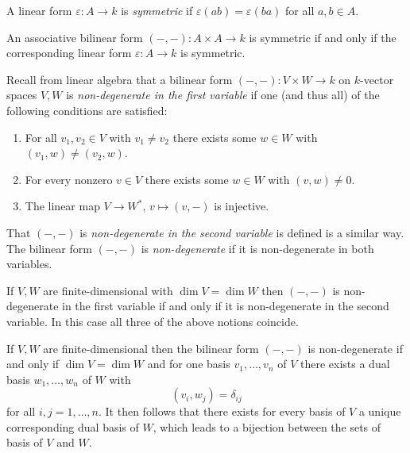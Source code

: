 \begin{definition}
  A linear form $\varepsilon \colon A \to k$ is \emph{symmetric} if $\varepsilon(ab) = \varepsilon(ba)$ for all $a, b \in A$.
\end{definition}


\begin{lemma}
  An associative bilinear form $(-,-) \colon A \times A \to k$ is symmetric if and only if the corresponding linear form $\varepsilon \colon A \to k$ is symmetric.
\end{lemma}


\begin{recall}
  Recall from linear algebra that a bilinear form $(-,-) \colon V \times W \to k$ on $k$-vector spaces $V,W$ is \emph{non-degenerate in the first variable} if one (and thus all) of the following conditions are satisfied:
  \begin{enumerate}
    \item
      For all $v_1, v_2 \in V$ with $v_1 \neq v_2$ there exists some $w \in W$ with $(v_1, w) \neq (v_2, w)$.
    \item
      For every nonzero $v \in V$ there exists some $w \in W$ with $(v,w) \neq 0$.
    \item
      The linear map $V \to W^*$, $v \mapsto (v,-)$ is injective.
  \end{enumerate}
  That $(-,-)$ is \emph{non-degenerate in the second variable} is defined is a similar way.
  The bilinear form $(-,-)$ is \emph{non-degenerate} if it is non-degenerate in both variables.
  
  If $V, W$ are finite-dimensional with $\dim V = \dim W$ then $(-,-)$ is non-degenerate in the first variable if and only if it is non-degenerate in the second variable.
  In this case all three of the above notions coincide.
  
  If $V,W$ are finite-dimensional then the bilinear form $(-,-)$ is non-degenerate if and only if $\dim V = \dim W$ and for one basis $v_1, \dotsc, v_n$ of $V$ there exists a dual basis $w_1, \dotsc, w_n$ of $W$ with
  \[
      (v_i, w_j)
    = \delta_{ij}
  \]
  for all $i,j = 1, \dotsc, n$.
  It then follows that there exists for every basis of $V$ a unique corresponding dual basis of $W$, which leads to a bijection between the sets of basis of $V$ and $W$.
\end{recall}



